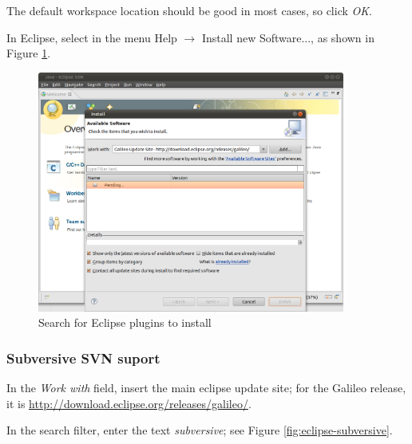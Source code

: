 \documentclass[a4paper, 10pt]{article}
\begin{document}
The default workspace location should be good in most cases, so click \emph{OK}.

In Eclipse, select in the menu Help $\rightarrow$ Install new Software..., as shown in
Figure \ref{fig:eclipse-update}.

    \begin{figure}[H]
    \centering
        \includegraphics[width=0.9\textwidth]{./png-install-guide/eclipse-update.png}
        \caption{Search for Eclipse plugins to install}
        \label{fig:eclipse-update}
    \end{figure}



\subsubsection{Subversive SVN suport}


In the \emph{Work with} field, insert the main eclipse update site;
for the Galileo release, it is
\url{http://download.eclipse.org/releases/galileo/}.

In the search filter, enter the text \emph{subversive};
see Figure \ref{fig:eclipse-subversive}.
\end{document}
